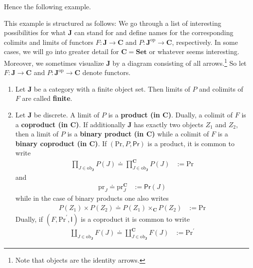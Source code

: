 Hence the following example.
\\
\begin{exa}
\label{exa:oflimits}
This example is structured as follows:
We go through a list of interesting possibilities for what $\mathbf{J}$ can stand for and define names for the corresponding colimits and limits of functors $F \colon \mathbf{J} \rightarrow \mathbf{C}$ and $P \colon \mathbf{J}^{\mathrm{op}} \rightarrow \mathbf{C}$, respectively.
In some cases, we will go into greater detail for $\mathbf{C} = \mathbf{Set}$ or whatever seems interesting.
Moreover, we sometimes visualize $\mathbf{J}$ by a diagram consisting of all arrows.\footnote{Note that objects are the identity arrows.}
So let $F \colon \mathbf{J} \rightarrow \mathbf{C}$ and $P \colon \mathbf{J}^{\mathrm{op}} \rightarrow \mathbf{C}$ denote functors.
\begin{enumerate}
\item[(1)]
Let $\mathbf{J}$ be a category with a finite object set.
Then limits of $P$ and colimits of $F$ are called \textbf{finite}.
\item[(2)]
Let $\mathbf{J}$ be discrete.
A limit of $P$ is a \textbf{product (in $\mathbf{C}$)}.
Dually, a colimit of $F$ is a \textbf{coproduct (in $\mathbf{C}$)}.
If additionally $\mathbf{J}$ has exactly two objects $Z_{1}$ and $Z_{2}$, then a limit of $P$ is a \textbf{binary product (in $\mathbf{C}$)} while a colimit of $F$ is a \textbf{binary coproduct (in $\mathbf{C}$)}.
If $(\mathrm{Pr},P,\mathsf{Pr})$ is a product, it is common to write
\begin{align*}
  \prod_{J \in \mathrm{ob}_{\mathbf{J}}}
  P(J)
  \doteq
  \prod_{J \in \mathrm{ob}_{\mathbf{J}}}^{\mathbf{C}}
  P(J)
  &:=
  \mathrm{Pr}
\end{align*}
and
\begin{align*}
  \mathrm{pr}_{J}
  \doteq
  \mathrm{pr}_{J}^{\mathbf{C}}
  &:=
  \mathsf{Pr}(J)
\end{align*}
while in the case of binary products one also writes
\begin{align*}
  P(Z_{1})
  \times
  P(Z_{2})
  \doteq
  P(Z_{1})
  \times_{\mathbf{C}}
  P(Z_{2})
  &:=
  \mathrm{Pr}
\end{align*}
Dually, if $(F,\mathrm{Pr}^{\prime},\mathsf{I})$ is a coproduct it is common to write
\begin{align*}
  \coprod_{J \in \mathrm{ob}_{\mathbf{J}}}
  F(J)
  \doteq
  \coprod_{J \in \mathrm{ob}_{\mathbf{J}}}^{\mathbf{C}}
  F(J)
  &:=
  \mathrm{Pr}^{\prime}
\end{align*}

\end{enumerate}
\end{exa}
